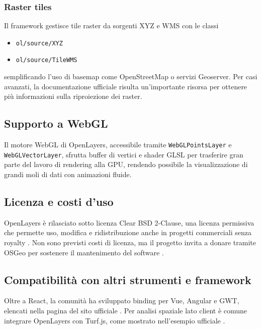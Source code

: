 \subsubsection*{Raster tiles}
Il framework gestisce tile raster da sorgenti XYZ e WMS con le classi 

\begin{itemize}
    \item \texttt{ol/source/XYZ} 
    \item \texttt{ol/source/TileWMS}
\end{itemize}

semplificando l'uso di basemap come OpenStreetMap o servizi Geoserver\cite{openlayers-raster-xyz}.  
Per casi avanzati, la documentazione ufficiale risulta un'importante risorsa per ottenere più informazioni sulla riproiezione dei raster.

\subsection{Supporto a WebGL}
Il motore WebGL di OpenLayers, accessibile tramite \texttt{WebGLPointsLayer} e \texttt{WebGLVectorLayer}, sfrutta buffer di vertici e shader GLSL per trasferire gran parte del lavoro di rendering alla GPU, rendendo possibile la visualizzazione di grandi moli di dati con animazioni fluide. \cite{openlayers-webgl-example,openlayers-webgl-workshop}

\subsection{Licenza e costi d'uso}
OpenLayers è rilasciato sotto licenza Clear BSD 2‑Clause, una licenza permissiva che permette uso, modifica e ridistribuzione anche in progetti commerciali senza royalty \cite{openlayers-github,ol-cesium-license}.  
Non sono previsti costi di licenza, ma il progetto invita a donare tramite OSGeo per sostenere il mantenimento del software \cite{openlayers-doc}.

\subsection{Compatibilità con altri strumenti e framework}
Oltre a React, la comunità ha sviluppato binding per Vue, Angular e GWT, elencati nella pagina  del sito ufficiale .  
Per analisi spaziale lato client è comune integrare OpenLayers con Turf.js, come mostrato nell'esempio ufficiale  \cite{awesome-openlayers,openlayers-turf-example}.  

\newpage